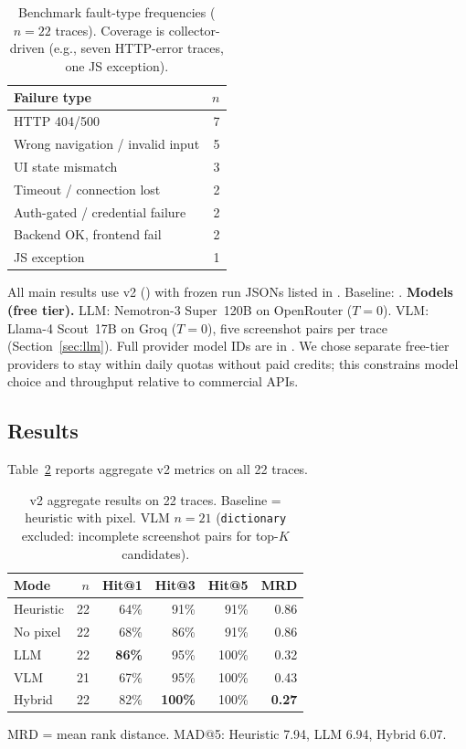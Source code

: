 \documentclass[sigconf,nonacm]{acmart}
\begin{document}
\begin{table}[t]
  \caption{Benchmark fault-type frequencies ($n{=}22$ traces). Coverage is collector-driven (e.g., seven HTTP-error traces, one JS exception).}
  \label{tab:benchmark}
  \small
  \begin{tabular}{lr}
    \toprule
    Failure type & $n$ \\
    \midrule
    HTTP 404/500 & 7 \\
    Wrong navigation / invalid input & 5 \\
    UI state mismatch & 3 \\
    Timeout / connection lost & 2 \\
    Auth-gated / credential failure & 2 \\
    Backend OK, frontend fail & 2 \\
    JS exception & 1 \\
    \bottomrule
  \end{tabular}
\end{table}

All main results use v2 () with frozen run JSONs listed in .
Baseline: .
\textbf{Models (free tier).}
LLM: Nemotron-3 Super~120B on OpenRouter ($T{=}0$).
VLM: Llama-4 Scout~17B on Groq ($T{=}0$), five screenshot pairs per trace (Section~\ref{sec:llm}).
Full provider model IDs are in .
We chose separate free-tier providers to stay within daily quotas without paid credits; this constrains model choice and throughput relative to commercial APIs.

\subsection{Results}

Table~\ref{tab:main} reports aggregate v2 metrics on all 22 traces.

\begin{table}[t]
  \caption{v2 aggregate results on 22 traces. Baseline = heuristic with pixel. VLM $n{=}21$ (\texttt{dictionary} excluded: incomplete screenshot pairs for top-$K$ candidates).}
  \label{tab:main}
  \small
  \begin{tabular}{lrrrrr}
    \toprule
    Mode & $n$ & Hit@1 & Hit@3 & Hit@5 & MRD \\
    \midrule
    Heuristic & 22 & 64\% & 91\% & 91\% & 0.86 \\
    No pixel & 22 & 68\% & 86\% & 91\% & 0.86 \\
    LLM & 22 & \textbf{86\%} & 95\% & 100\% & 0.32 \\
    VLM & 21 & 67\% & 95\% & 100\% & 0.43 \\
    Hybrid & 22 & 82\% & \textbf{100\%} & 100\% & \textbf{0.27} \\
    \bottomrule
  \end{tabular}

  \vspace{4pt}
  {\footnotesize MRD = mean rank distance. MAD@5: Heuristic 7.94, LLM 6.94, Hybrid 6.07.}
\end{table}
\end{document}
